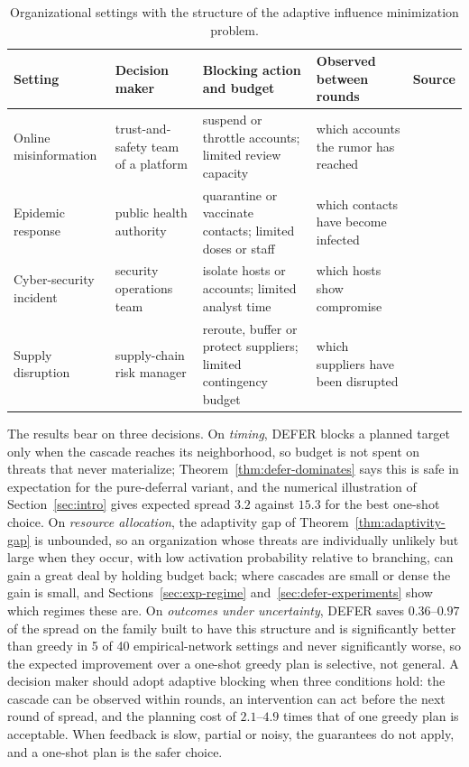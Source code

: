 \documentclass[preprint,11pt]{elsarticle}
\theoremstyle{definition}
\theoremstyle{remark}
\newcommand{\up}{\rule{0pt}{2.6ex}}
\begin{document}
\begin{table}[h]
\centering
\caption{Organizational settings with the structure of the adaptive influence minimization problem.}\label{tab:org}
\small
\begin{tabular}{@{}>{\raggedright\arraybackslash}p{}>{\raggedright\arraybackslash}p{}>{\raggedright\arraybackslash}p{}>{\raggedright\arraybackslash}p{}>{\raggedright\arraybackslash}p{}@{}}
\hline
\up Setting & Decision maker & Blocking action and budget & Observed between rounds & Source \\
\hline
\up Online misinformation & trust-and-safety team of a platform & suspend or throttle accounts; limited review capacity & which accounts the rumor has reached & \citep{vosoughi2018,lazer2018} \\
Epidemic response & public health authority & quarantine or vaccinate contacts; limited doses or staff & which contacts have become infected & \citep{nowzari2016} \\
Cyber-security incident & security operations team & isolate hosts or accounts; limited analyst time & which hosts show compromise & \citep{bhuiyan2021} \\
Supply disruption & supply-chain risk manager & reroute, buffer or protect suppliers; limited contingency budget & which suppliers have been disrupted & \citep{li2021,dolgui2021} \\
\hline
\end{tabular}
\end{table}

The results bear on three decisions. On \emph{timing}, DEFER blocks a planned target only when the cascade reaches its neighborhood, so budget is not spent on threats that never materialize; Theorem~\ref{thm:defer-dominates} says this is safe in expectation for the pure-deferral variant, and the numerical illustration of Section~\ref{sec:intro} gives expected spread $3.2$ against $15.3$ for the best one-shot choice. On \emph{resource allocation}, the adaptivity gap of Theorem~\ref{thm:adaptivity-gap} is unbounded, so an organization whose threats are individually unlikely but large when they occur, with low activation probability relative to branching, can gain a great deal by holding budget back; where cascades are small or dense the gain is small, and Sections~\ref{sec:exp-regime} and~\ref{sec:defer-experiments} show which regimes these are. On \emph{outcomes under uncertainty}, DEFER saves $0.36$--$0.97$ of the spread on the family built to have this structure and is significantly better than greedy in 5 of 40 empirical-network settings and never significantly worse, so the expected improvement over a one-shot greedy plan is selective, not general. A decision maker should adopt adaptive blocking when three conditions hold: the cascade can be observed within rounds, an intervention can act before the next round of spread, and the planning cost of $2.1$--$4.9$ times that of one greedy plan is acceptable. When feedback is slow, partial or noisy, the guarantees do not apply, and a one-shot plan is the safer choice.
\end{document}
